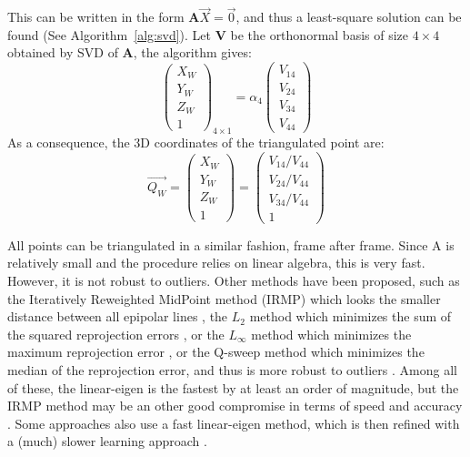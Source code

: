 This can be written in the form \(\textbf{A} \overrightarrow{X} = \overrightarrow{0}\), and thus a least-square solution can be found (See Algorithm~\ref{alg:svd}). Let $\textbf{V}$ be the orthonormal basis of size $4 \times 4$ obtained by SVD of $\textbf{A}$, the algorithm gives:
\begin{equation}
  \begin{pmatrix} X_W \\ Y_W \\ Z_W\\1 \end{pmatrix}_{\!\!4\times 1} 
  = \alpha_4 \begin{pmatrix}V_{14} \\V_{24} \\V_{34} \\V_{44}\end{pmatrix} 
\end{equation} 
As a consequence, the 3D coordinates of the triangulated point are:
\begin{equation}
  \boxed{
  \overrightarrow{Q_W}=\begin{pmatrix}X_W \\Y_W \\Z_W \\1\end{pmatrix} = \begin{pmatrix}V_{14}/V_{44} \\V_{24}/V_{44} \\V_{34}/V_{44} \\1\end{pmatrix}
  }
\end{equation}  

All points can be triangulated in a similar fashion, frame after frame. Since A is relatively small and the procedure relies on linear algebra, this is very fast. However, it is not robust to outliers. Other methods have been proposed, such as the Iteratively Reweighted MidPoint method (IRMP) which looks the smaller distance between all epipolar lines \cite{Yang2019}, the $L_2$ method which minimizes the sum of the squared reprojection errors \cite{Marquardt1963,More1978}, or the $L_\infty$ method which minimizes the maximum reprojection error \cite{Donne2015}, or the Q-sweep method which minimizes the median of the reprojection error, and thus is more robust to outliers \cite{Zhang2017}. Among all of these, the linear-eigen is the fastest by at least an order of magnitude, but the IRMP method may be an other good compromise in terms of speed and accuracy \cite{Chen2020b}. Some approaches also use a fast linear-eigen method, which is then refined with a (much) slower learning approach \cite{Tome2018}.

